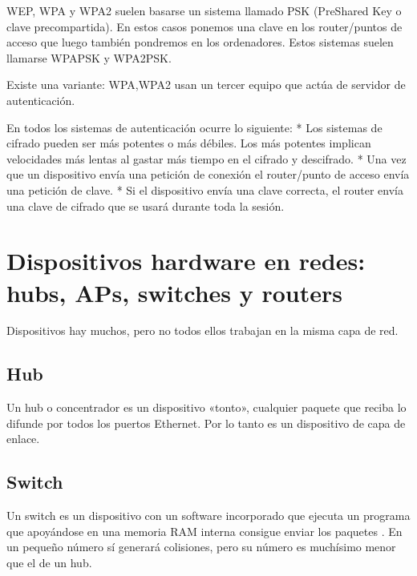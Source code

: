 \documentclass[letterpaper,10pt,spanish]{sphinxmanual}
\begin{document}
\sphinxAtStartPar
WEP, WPA y WPA2 suelen basarse un sistema llamado PSK (Pre\sphinxhyphen{}Shared Key o clave pre\sphinxhyphen{}compartida). En estos casos ponemos una clave en los router/puntos de acceso que luego también pondremos en los ordenadores. Estos sistemas suelen llamarse WPA\sphinxhyphen{}PSK y WPA2\sphinxhyphen{}PSK.

\sphinxAtStartPar
Existe una variante: WPA,WPA2 usan un tercer equipo que actúa de servidor de autenticación.

\sphinxAtStartPar
En todos los sistemas de autenticación ocurre lo siguiente:
* Los sistemas de cifrado pueden ser más potentes o más débiles. Los más potentes implican velocidades más lentas al gastar más tiempo en el cifrado y descifrado.
* Una vez que un dispositivo envía una petición de conexión el router/punto de acceso envía una petición de clave.
* Si el dispositivo envía una clave correcta, el router envía una clave de cifrado que se usará durante toda la sesión.


\section{Dispositivos hardware en redes: hubs, APs, switches y routers}
\label{\detokenize{t2_integracion_elementos/apuntes_t2:dispositivos-hardware-en-redes-hubs-aps-switches-y-routers}}
\sphinxAtStartPar
Dispositivos hay muchos, pero no todos ellos trabajan en la misma capa de red.


\subsection{Hub}
\label{\detokenize{t2_integracion_elementos/apuntes_t2:hub}}
\sphinxAtStartPar
Un hub o concentrador es un dispositivo «tonto», cualquier paquete que reciba lo difunde por todos los puertos Ethernet. Por lo tanto es un dispositivo de capa de enlace.


\subsection{Switch}
\label{\detokenize{t2_integracion_elementos/apuntes_t2:switch}}
\sphinxAtStartPar
Un switch es un dispositivo con un software incorporado que ejecuta un programa que apoyándose en una memoria RAM interna consigue enviar los paquetes . En un pequeño número sí generará colisiones, pero su número es muchísimo menor que el de un hub.
\end{document}
